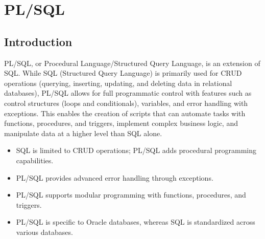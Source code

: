 
\section{PL/SQL}
\subsection{Introduction}
\begin{tcolorbox}[title = Definition]
PL/SQL, or Procedural Language/Structured Query Language, is an extension of SQL. While SQL (Structured Query Language) is primarily used for CRUD operations (querying, inserting, updating, and deleting data in relational databases), PL/SQL allows for full programmatic control with features such as control structures (loops and conditionals), variables, and error handling with exceptions. This enables the creation of scripts that can automate tasks with functions, procedures, and triggers, implement complex business logic, and manipulate data at a higher level than SQL alone.
\end{tcolorbox}

\begin{tcolorbox}[title = Differences Between PL/SQL and SQL]
\begin{itemize}
    \item SQL is limited to CRUD operations; PL/SQL adds procedural programming capabilities.
    \item PL/SQL provides advanced error handling through exceptions.
    \item PL/SQL supports modular programming with functions, procedures, and triggers.
    \item PL/SQL is specific to Oracle databases, whereas SQL is standardized across various databases.
\end{itemize} 
\end{tcolorbox}

